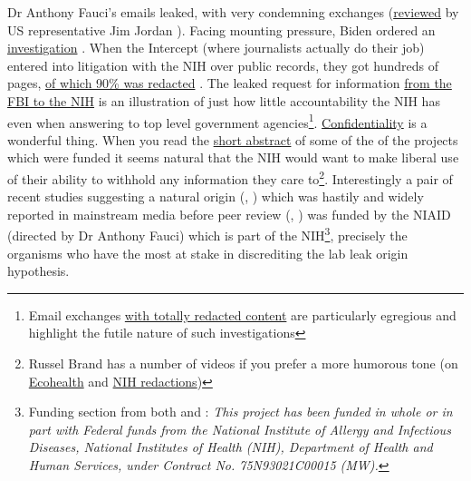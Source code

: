 \documentclass[11pt,a4paper,notitlepage]{report}
\begin{document}
Dr Anthony Fauci's emails leaked, with very condemning exchanges (\href{https://www.youtube.com/watch?v=q3F2ZJGipiE}{reviewed} by US representative Jim Jordan \cite{jimjordan29062021}). Facing mounting pressure, Biden ordered an \href{https://www.bbc.com/news/world-us-canada-57260009}{investigation} \cite{bbc27052021}. When the Intercept (where journalists actually do their job) entered into litigation with the NIH over public records, they got hundreds of pages, \href{https://theintercept.com/2022/02/20/nih-coronavirus-research-wuhan-redacted/}{of which 90\% was redacted} \cite{intercept20022022}. The leaked request for information \href{https://theintercept.com/2022/01/20/coronavirus-research-china-ecohealth-fbi/}{from the FBI to the NIH} \cite{intercept20022022b} is an illustration of just how little accountability the NIH has even when answering to top level government agencies\footnote{Email exchanges \href{https://www.documentcloud.org/documents/21182424-pages-from-nih_foia_274}{with totally redacted content} are particularly egregious and highlight the futile nature of such investigations}. \href{https://grants.nih.gov/grants/policy/nihgps/html5/section_2/2.3.11_availability_and_confidentiality_of_information.htm}{Confidentiality} is a wonderful thing. When you read the \href{https://reporter.nih.gov/search/-bvPCvB7zkyvb1AjAgW5Yg/project-details/8674931}{short abstract} of some of the of the projects which were funded \cite{nih-ecohealth} it seems natural that the NIH would want to make liberal use of their ability to withhold any information they care to\footnote{Russel Brand has a number of videos if you prefer a more humorous tone (on \href{https://www.youtube.com/watch?v=yTbzyirwnoQ}{Ecohealth} and \href{https://www.youtube.com/watch?v=ZNKG8d0ujwo}{NIH redactions})}. Interestingly a pair of recent studies suggesting a natural origin (\cite{pekar_jonathan_e_2022_6332858}, \cite{michael_worobey_2022_6299116}) which was hastily and widely reported in mainstream media before peer review (\cite{guardian26022022}, \cite{newyorktimes27012022}) was funded by the NIAID (directed by Dr Anthony Fauci) which is part of the NIH\footnote{Funding section from both \citet{pekar_jonathan_e_2022_6332858} and \citet{michael_worobey_2022_6299116} : \textit{This project has been funded in whole or in part with Federal funds from the National Institute of Allergy and Infectious Diseases, National Institutes of Health (NIH), Department of Health and Human Services, under Contract No. 75N93021C00015 (MW).}}, precisely the organisms who have the most at stake in discrediting the lab leak origin hypothesis. 
\end{document}
